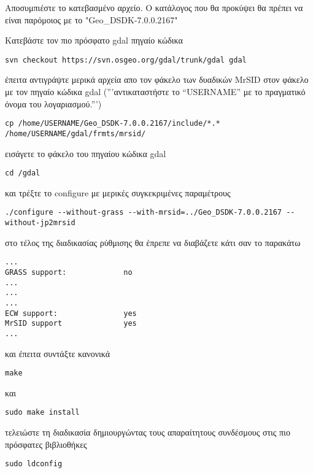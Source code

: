 Αποσυμπιέστε το κατεβασμένο αρχείο. Ο κατάλογος που θα προκύψει θα πρέπει να είναι παρόμοιος με το "Geo\_DSDK-7.0.0.2167"

Κατεβάστε τον πιο πρόσφατο gdal πηγαίο κώδικα

\begin{verbatim}
svn checkout https://svn.osgeo.org/gdal/trunk/gdal gdal
\end{verbatim}

έπειτα αντιγράψτε μερικά αρχεία απο τον φάκελο των δυαδικών MrSID
 στον φάκελο με τον πηγαίο κώδικα gdal
('''αντικαταστήστε το “USERNAME” με το πραγματικό όνομα του λογαριασμού.''')

\begin{verbatim}
cp /home/USERNAME/Geo_DSDK-7.0.0.2167/include/*.* /home/USERNAME/gdal/frmts/mrsid/
\end{verbatim}

εισάγετε το φάκελο του πηγαίου κώδικα gdal 

\begin{verbatim}
cd /gdal
\end{verbatim}

και τρέξτε το configure με μερικές συγκεκριμένες παραμέτρους

\begin{verbatim}
./configure --without-grass --with-mrsid=../Geo_DSDK-7.0.0.2167 --without-jp2mrsid
\end{verbatim}

στο τέλος της διαδικασίας ρύθμισης θα έπρεπε να διαβάζετε κάτι σαν το παρακάτω 

\begin{verbatim}
...
GRASS support:             no
...
...
...
ECW support:               yes
MrSID support              yes			
...
\end{verbatim}

και έπειτα συντάξτε κανονικά

\begin{verbatim}
make
\end{verbatim}

και 

\begin{verbatim}
sudo make install
\end{verbatim}

τελειώστε τη διαδικασία δημιουργώντας τους απαραίτητους συνδέσμους στις πιο πρόσφατες βιβλιοθήκες

\begin{verbatim}
sudo ldconfig
\end{verbatim}

